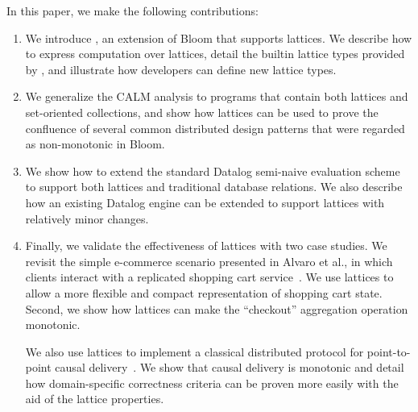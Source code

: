 In this paper, we make the following contributions:
\begin{enumerate}

\item
  We introduce \lang, an extension of Bloom that supports lattices. We describe
  how to express computation over lattices, detail the builtin lattice types
  provided by \lang, and illustrate how developers can define new lattice
  types.

\item 
  We generalize the CALM analysis to programs that contain both lattices and
  set-oriented collections, and show how lattices can be used to prove the
  confluence of several common distributed design patterns that were regarded as
  non-monotonic in Bloom. %

\item
  We show how to extend the standard Datalog semi-naive evaluation
  scheme~\cite{Balbin1987} to support both lattices and traditional database
  relations. We also describe how an existing Datalog engine can be extended to
  support lattices with relatively minor changes.

\item
  Finally, we validate the effectiveness of lattices with two case studies. We
  revisit the simple e-commerce scenario presented in Alvaro et al., in which
  clients interact with a replicated shopping cart service~\cite{Alvaro2011}. We
  use lattices to allow a more flexible and compact representation of shopping
  cart state. Second, we show how lattices can make the ``checkout'' aggregation
  operation monotonic.

  We also use lattices to implement a classical distributed protocol for
  point-to-point causal delivery~\cite{Schiper1989}. We show that causal
  delivery is monotonic and detail how domain-specific correctness criteria can
  be proven more easily with the aid of the lattice properties.
\end{enumerate}

